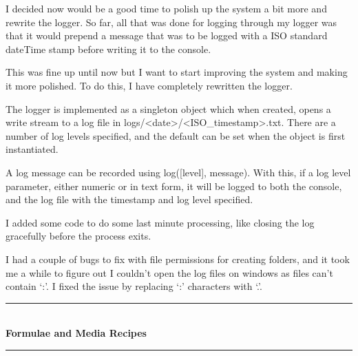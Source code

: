 \documentclass[idxtotoc,hyperref,openany]{labbook} %
\newcommand{\HRule}{\rule{\linewidth}{0.5mm}} %
\begin{document}

I decided now would be a good time to polish up the system a bit more and rewrite the logger.  So far, all that was done for logging through my logger was that it would prepend a message that was to be logged with a ISO standard dateTime stamp before writing it to the console.

This was fine up until now but I want to start improving the system and making it more polished.  To do this, I have completely rewritten the logger.

The logger is implemented as a singleton object which when created, opens a write stream to a log file in logs/<date>/<ISO\_timestamp>.txt.  There are a number of log levels specified, and the default can be set when the object is first instantiated.

A log message can be recorded using log([level], message).  With this, if a log level parameter, either numeric or in text form, it will be logged to both the console, and the log file with the timestamp and log level specified.

I added some code to do some last minute processing, like closing the log gracefully before the process exits.

I had a couple of bugs to fix with file permissions for creating folders, and it took me a while to figure out I couldn't open the log files on windows as files can't contain `:'.  I fixed the issue by replacing `:' characters with `.'.


\labday{} %

\begin{center}
\HRule \\[0.4cm]
{\huge \textbf{Formulae and Media Recipes}}\\[0.4cm] %
\HRule \\[1.5cm]
\end{center}


\newpage

\end{document}

